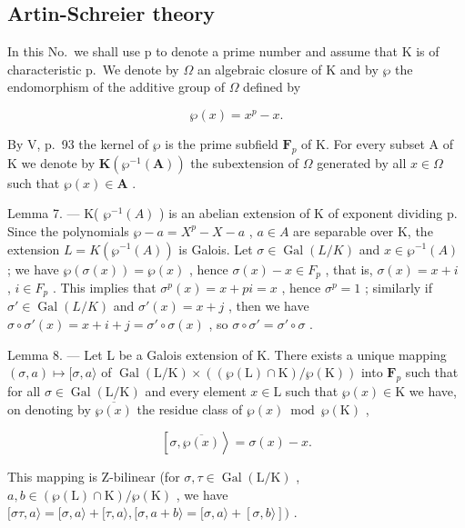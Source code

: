 \subsection{Artin-Schreier theory}

In this No.~we shall use p to denote a prime number and assume that K is of characteristic p.~We denote by \(\Omega\) an algebraic closure of K and by \(\wp\) the endomorphism of the additive group of \(\Omega\) defined by

\[
\wp (x) = x ^ {p} - x.
\]

By V, p.~93 the kernel of \(\wp\) is the prime subfield \(\mathbf{F}_p\) of K. For every subset A of K we denote by \(\mathbf{K}(\wp^{-1}(\mathbf{A}))\) the subextension of \(\Omega\) generated by all \(x \in \Omega\) such that \(\wp(x) \in \mathbf{A}\) .

Lemma 7. --- K( \(\wp^{-1}(A)\) ) is an abelian extension of K of exponent dividing p. Since the polynomials \(\wp - a = X^{p} - X - a\) , \(a \in A\) are separable over K, the extension \(L = K(\wp^{-1}(A))\) is Galois. Let \(\sigma \in \operatorname{Gal}(L/K)\) and \(x \in \wp^{-1}(A)\) ; we have \(\wp(\sigma(x)) = \wp(x)\) , hence \(\sigma(x) - x \in F_{p}\) , that is, \(\sigma(x) = x + i\) , \(i \in F_{p}\) . This implies that \(\sigma^{p}(x) = x + pi = x\) , hence \(\sigma^{p} = 1\) ; similarly if \(\sigma' \in \operatorname{Gal}(L/K)\) and \(\sigma'(x) = x + j\) , then we have \(\sigma \circ \sigma'(x) = x + i + j = \sigma' \circ \sigma(x)\) , so \(\sigma \circ \sigma' = \sigma' \circ \sigma\) .

Lemma 8. --- Let L be a Galois extension of K. There exists a unique mapping \((\sigma, a) \mapsto [\sigma, a\rangle\) of \(\operatorname{Gal}(\mathrm{L} / \mathrm{K}) \times ((\wp(\mathrm{L}) \cap \mathrm{K}) / \wp(\mathrm{K}))\) into \(\mathbf{F}_p\) such that for all \(\sigma \in \operatorname{Gal}(\mathrm{L} / \mathrm{K})\) and every element \(x \in \mathrm{L}\) such that \(\wp(x) \in \mathrm{K}\) we have, on denoting by \(\overline{\wp(x)}\) the residue class of \(\wp(x) \bmod \wp(\mathrm{K})\) ,

\[
\left[ \sigma , \overline {{{\wp (x)}}} \right\rangle = \sigma (x) - x.\tag{15}
\]

This mapping is Z-bilinear (for \(\sigma, \tau \in \operatorname{Gal}(\mathrm{L} / \mathrm{K})\) , \(a, b \in (\wp(\mathrm{L}) \cap \mathrm{K}) / \wp(\mathrm{K})\) , we have \([\sigma \tau, a\rangle = [\sigma, a\rangle + [\tau, a\rangle, [\sigma, a + b\rangle = [\sigma, a\rangle + [\sigma, b\rangle])\) .

